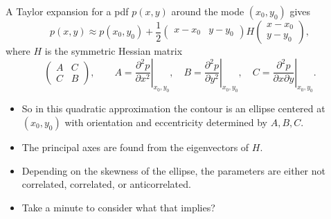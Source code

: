 \documentclass[%
oneside,                 %
final,                   %
10pt]{article}
\begin{document}
A Taylor expansion for a pdf $p(x,y)$ around the mode $(x_0,y_0)$ gives
\[
p(x,y) \approx p(x_0,y_0) + \frac{1}{2} \begin{pmatrix} x-x_0 & y-y_0 \end{pmatrix}
H
\begin{pmatrix} x-x_0 \\ y-y_0 \end{pmatrix},
\]
where $H$ is the symmetric Hessian matrix
\[
\begin{pmatrix}
A & C \\ C & B
\end{pmatrix}, \qquad 
A = \left. \frac{\partial^2 p}{\partial x^2} \right|_{x_0,y_0}, \quad
B = \left. \frac{\partial^2 p}{\partial y^2} \right|_{x_0,y_0}, \quad
C = \left. \frac{\partial^2 p}{\partial x \partial y} \right|_{x_0,y_0}.
\]

\begin{itemize}
\item So in this quadratic approximation the contour is an ellipse centered at $(x_0,y_0)$ with orientation and eccentricity determined by $A,B,C$.

\item The principal axes are found from the eigenvectors of $H$.

\item Depending on the skewness of the ellipse, the parameters are either not correlated, correlated, or anticorrelated.

\item Take a minute to consider what that implies?
\end{itemize}

\noindent


\end{document}
